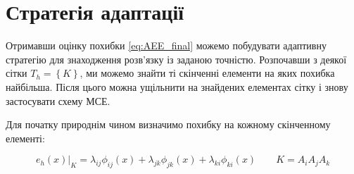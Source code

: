 
\section{Стратегія адаптації}

Отримавши оцінку похибки \eqref{eq:AEE_final} можемо побудувати адаптивну стратегію для знаходження розв'язку із заданою точністю.
Розпочавши з деякої сітки $T_h =  \left\{ K \right\}$, ми можемо знайти ті скінченні елементи на яких похибка найбільша.
Після цього можна ущільнити на знайдених елементах сітку і знову застосувати схему МСЕ.

Для початку природнім чином визначимо похибку на кожному скінченному елементі:

\newcommand{\error}[1]{\lambda_{#1} \phi_{#1}(x)}

\begin{equation}\label{eq:error_element}
	e_h(x)|_K = \error{ij}+\error{jk}+\error{ki} \qquad K = A_iA_jA_k
\end{equation}

\undef{\error}

